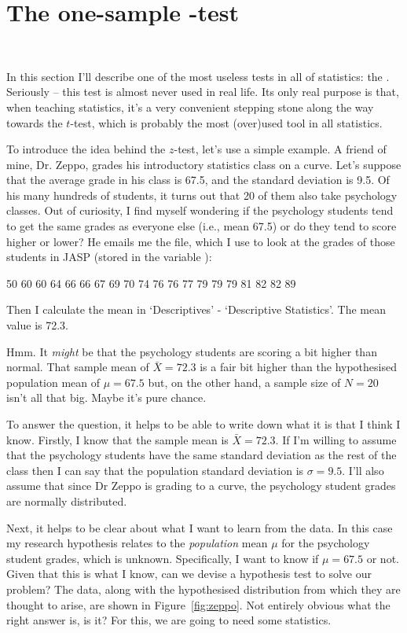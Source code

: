 \section{The one-sample \texorpdfstring{}{}-test}~\label{sec:onesampleztest}

In this section I'll describe one of the most useless tests in all of statistics: the . Seriously -- this test is almost never used in real life. Its only real purpose is that, when teaching statistics, it's a very convenient stepping stone along the way towards the $t$-test, which is probably the most (over)used tool in all statistics.


To introduce the idea behind the $z$-test, let's use a simple example. A friend of mine, Dr. Zeppo, grades his introductory statistics class on a curve. Let's suppose that the average grade in his class is 67.5, and the standard deviation is 9.5. Of his many hundreds of students, it turns out that 20 of them also take psychology classes. Out of curiosity, I find myself wondering if the psychology students tend to get the same grades as everyone else (i.e., mean 67.5) or do they tend to score higher or lower? He emails me the  file, which I use to look at the grades of those students in JASP (stored in the variable ): 
\begin{rblock1}
50 60 60 64 66 66 67 69 70 74 76 76 77 79 79 79 81 82 82 89
\end{rblock1} 
Then I calculate the mean in `Descriptives' - `Descriptive Statistics'. The mean value is 72.3.

Hmm. It {\it might} be that the psychology students are scoring a bit higher than normal. That sample mean of $\bar{X} = 72.3$ is a fair bit higher than the hypothesised population mean of $\mu = 67.5$ but, on the other hand, a sample size of $N = 20$ isn't all that big. Maybe it's pure chance. 

To answer the question, it helps to be able to write down what it is that I think I know. Firstly, I know that the sample mean is $\bar{X} = 72.3$. If I'm willing to assume that the psychology students have the same standard deviation as the rest of the class then I can say that the population standard deviation is $\sigma = 9.5$. I'll also assume that since Dr Zeppo is grading to a curve, the psychology student grades are normally distributed. 

Next, it helps to be clear about what I want to learn from the data. In this case my research hypothesis relates to the {\it population} mean $\mu$ for the psychology student grades, which is unknown. Specifically, I want to know if $\mu = 67.5$ or not. Given that this is what I know, can we devise a hypothesis test to solve our problem? The data, along with the hypothesised distribution from which they are thought to arise, are shown in Figure~\ref{fig:zeppo}. Not entirely obvious what the right answer is, is it? For this, we are going to need some statistics.

